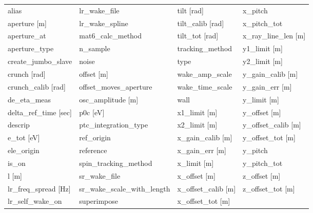  \begin{tabular}{llll} \toprule
alias                          & lr_wake_file                   & tilt [rad]                     & x_pitch                        \\
aperture [m]                   & lr_wake_spline                 & tilt_calib [rad]               & x_pitch_tot                    \\
aperture_at                    & mat6_calc_method               & tilt_tot [rad]                 & x_ray_line_len [m]             \\
aperture_type                  & n_sample                       & tracking_method                & y1_limit [m]                   \\
create_jumbo_slave             & noise                          & type                           & y2_limit [m]                   \\
crunch [rad]                   & offset [m]                     & wake_amp_scale                 & y_gain_calib [m]               \\
crunch_calib [rad]             & offset_moves_aperture          & wake_time_scale                & y_gain_err [m]                 \\
de_eta_meas                    & osc_amplitude [m]              & wall                           & y_limit [m]                    \\
delta_ref_time [sec]           & p0c [eV]                       & x1_limit [m]                   & y_offset [m]                   \\
descrip                        & ptc_integration_type           & x2_limit [m]                   & y_offset_calib [m]             \\
e_tot [eV]                     & ref_origin                     & x_gain_calib [m]               & y_offset_tot [m]               \\
ele_origin                     & reference                      & x_gain_err [m]                 & y_pitch                        \\
is_on                          & spin_tracking_method           & x_limit [m]                    & y_pitch_tot                    \\
l [m]                          & sr_wake_file                   & x_offset [m]                   & z_offset [m]                   \\
lr_freq_spread [Hz]            & sr_wake_scale_with_length      & x_offset_calib [m]             & z_offset_tot [m]               \\
lr_self_wake_on                & superimpose                    & x_offset_tot [m]               &                                \\
 \bottomrule
 \end{tabular}
 \vfill
 
